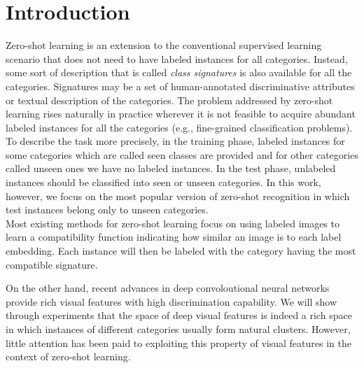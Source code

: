 \documentclass[10pt,twocolumn,letterpaper]{article}
\begin{document}
\section{Introduction}
Zero-shot learning is an extension to the conventional supervised learning scenario that does not need to have labeled instances for all categories. Instead, some sort of description that is called \textit{class signatures} is also available for all the categories. Signatures may be a set of human-annotated discriminative attributes or textual description of the categories.
The problem addressed by zero-shot learning rises naturally in practice wherever it is not feasible to acquire abundant labeled instances for all the categories (e.g., fine-grained classification problems).
To describe the task more precisely, in the training phase, labeled instances for some categories which are called seen classes are provided and for other categories called unseen ones we have no labeled instances.
In the test phase, unlabeled instances should be classified into seen or unseen categories. In this work, however, we focus on the most popular version of zero-shot recognition in which test instances belong only to unseen categories.
\\
Most existing methods for zero-shot learning focus on using labeled images to learn a compatibility function indicating how similar an image is
to each label embedding. Each instance will then be labeled with the category having the most compatible signature.

 On the other hand, recent advances in deep convoloutional neural networks provide rich visual features with high discrimination capability. We will show through experiments that the space of deep visual features is indeed a rich space in which instances of different categories usually form natural clusters. However, little attention has been paid to exploiting this property of visual features in the context of zero-shot learning. 
 
 
\end{document}
